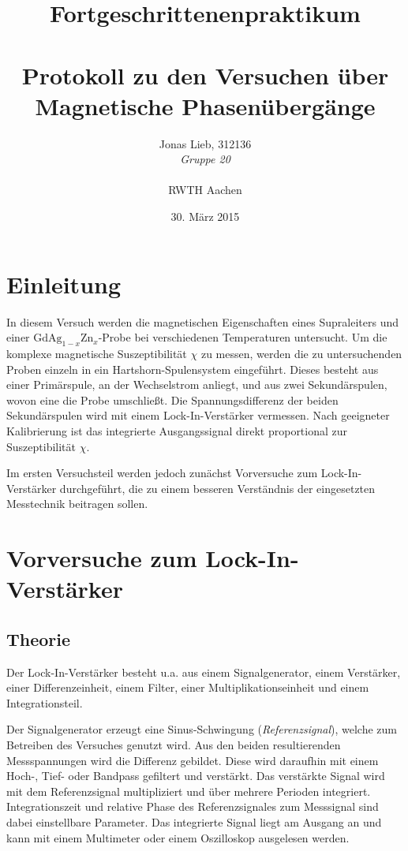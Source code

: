 \documentclass{../Misc/MontavonLaTeX/Montavon}
\date{30. März 2015}
\newcommand{\gdagzn}{$\textrm{GdAg}_{1-x}\textrm{Zn}_x$}
\begin{document}
\title{Fortgeschrittenenpraktikum \\ \quad \\ Protokoll zu den Versuchen über \\ Magnetische Phasenübergänge}
\author{Jonas Lieb, 312136 \\ \emph{Gruppe 20} \\ \\  RWTH Aachen}
\maketitle


\newpage

\setcounter{tocdepth}{2}
\tableofcontents
\newpage

\section{Einleitung}
In diesem Versuch werden die magnetischen Eigenschaften eines Supraleiters und einer \gdagzn-Probe bei verschiedenen Temperaturen untersucht. Um die komplexe magnetische Suszeptibilität $\chi$ zu messen, werden die zu untersuchenden Proben einzeln in ein Hartshorn-Spulensystem eingeführt. Dieses besteht aus einer Primärspule, an der Wechselstrom anliegt, und aus zwei Sekundärspulen, wovon eine die Probe umschließt. Die Spannungsdifferenz der beiden Sekundärspulen wird mit einem Lock-In-Verstärker vermessen. Nach geeigneter Kalibrierung ist das integrierte Ausgangssignal direkt proportional zur Suszeptibilität $\chi$.

Im ersten Versuchsteil werden jedoch zunächst Vorversuche zum Lock-In-Verstärker durchgeführt, die zu einem besseren Verständnis der eingesetzten Messtechnik beitragen sollen.

\section{Vorversuche zum Lock-In-Verstärker}
\subsection{Theorie}
Der Lock-In-Verstärker besteht u.a. aus einem Signalgenerator, einem Verstärker, einer Differenzeinheit, einem Filter, einer Multiplikationseinheit und einem Integrationsteil. 

Der Signalgenerator erzeugt eine Sinus-Schwingung (\emph{Referenzsignal}), welche zum Betreiben des Versuches genutzt wird. Aus den beiden resultierenden Messspannungen wird die Differenz gebildet. Diese wird daraufhin mit einem Hoch-, Tief- oder Bandpass gefiltert und verstärkt. Das verstärkte Signal wird mit dem Referenzsignal multipliziert und über mehrere Perioden integriert. Integrationszeit und relative Phase des Referenzsignales zum Messsignal sind dabei einstellbare Parameter. Das integrierte Signal liegt am Ausgang an und kann mit einem Multimeter oder einem Oszilloskop ausgelesen werden.
\end{document}

